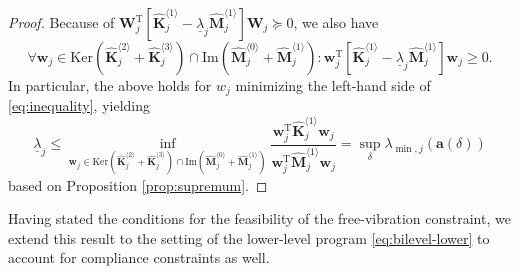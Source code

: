 \documentclass[final,onefignum,onetabnum]{siamart220329}
\newtheorem*{proof}{Proof}%
\begin{document}
\begin{proof}
Because of $\mathbf{W}_j^\mathrm{T}\left[\hat{\mathbf{K}}_{j}^{\langle 1\rangle} - \underline{\lambda}_j \hat{\mathbf{M}}_{j}^{\langle 1\rangle} \right]\mathbf{W}_j \succeq 0$, we also have
%
\begin{equation}\label{eq:inequality}
	\forall \mathbf{w}_j \in \mathrm{Ker}\left(\hat{\mathbf{K}}_j^{\langle 2\rangle} + \hat{\mathbf{K}}_j^{\langle 3\rangle}\right) \cap \mathrm{Im}\left(\hat{\mathbf{M}}_j^{\langle 0\rangle} + \hat{\mathbf{M}}_j^{\langle 1\rangle}\right):  \mathbf{w}_j^\mathrm{T} \left[\hat{\mathbf{K}}_{j}^{\langle 1\rangle} - \underline{\lambda}_j \hat{\mathbf{M}}_{j}^{\langle 1\rangle} \right] \mathbf{w}_j \ge 0.
\end{equation}
%
In particular, the above holds for $w_j$ minimizing the left-hand side of \eqref{eq:inequality}, yielding
%
\begin{equation}
	\underline{\lambda}_j \le \inf_{\mathbf{w}_j \in \mathrm{Ker}\left(\hat{\mathbf{K}}_j^{\langle 2\rangle} + \hat{\mathbf{K}}_j^{\langle 3\rangle}\right) \cap \mathrm{Im}\left(\hat{\mathbf{M}}_j^{\langle 0\rangle} + \hat{\mathbf{M}}_j^{\langle 1\rangle}\right)} \frac{\mathbf{w}_j^\mathrm{T} \hat{\mathbf{K}}_{j}^{\langle 1\rangle} \mathbf{w}_j}{\mathbf{w}_j^\mathrm{T} \hat{\mathbf{M}}_{j}^{\langle 1\rangle} \mathbf{w}_j} = \sup_{\delta} \lambda_{\min,j}(\mathbf{a}(\delta))
\end{equation}
%
based on Proposition \ref{prop:supremum}.
\end{proof}

Having stated the conditions for the feasibility of the free-vibration constraint, we extend this result to the setting of the lower-level program \eqref{eq:bilevel-lower} to account for compliance constraints as well.
\end{document}
